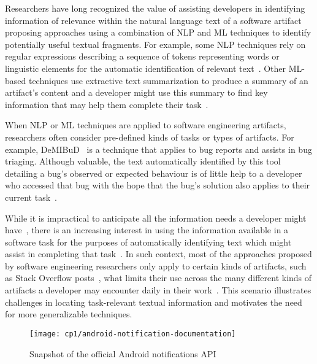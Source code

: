 



Researchers have long recognized the value of assisting developers in 
identifying information of relevance within the natural language
text of a software artifact
proposing approaches using a combination of \acf{NLP} and \acf{ML} techniques to identify potentially useful textual fragments. 
For example, some \acs{NLP} techniques rely on regular expressions describing a sequence of tokens
representing words or linguistic elements for the automatic identification 
of relevant text~\cite{Bavota2016, Chaparro2017}. 
Other \acs{ML}-based techniques use extractive text summarization 
to produce a summary of an artifact's content
and a developer might use this summary to find key information
that may help them complete their task~\cite{Bavota2016}.



When \acs{NLP} or \acs{ML} techniques are applied to software engineering artifacts, researchers often 
consider pre-defined kinds of tasks or types of artifacts.
For example, {\small DeMIBuD}~\cite{Chaparro2017} is a technique that applies to bug reports and 
assists in bug triaging. Although valuable, the text  automatically identified by this tool detailing a bug's observed or expected
behaviour 
 is of little help to a developer who accessed that bug 
with the hope that the bug's solution also applies to their current task~\cite{Viviani2019}.


While it is impractical to anticipate all the information needs a developer might have~\cite{sillito2006, josyula2018, ko2007}, there is an increasing interest in using the information 
available in a software task for the purposes of automatically identifying text 
which might assist in completing that task~\cite{Bavota2016}. 
In such context, most of the approaches proposed by software engineering researchers 
 only apply to certain kinds of artifacts, such as Stack Overflow posts~\cite{Xu2017, silva2019}, what limits their use across the
many different kinds of artifacts a developer may encounter
daily in their work~\cite{Li2013}.
This scenario illustrates challenges in locating task-relevant textual information and motivates the need for more generalizable techniques.




\clearpage


\begin{landscape}
\begin{figure}
    \centering
    \texttt{[image: cp1/android-notification-documentation]}
    \caption{Snapshot of the official Android notifications API}
    \label{fig:android-notifications-api-page}
\end{figure}

\end{landscape}

